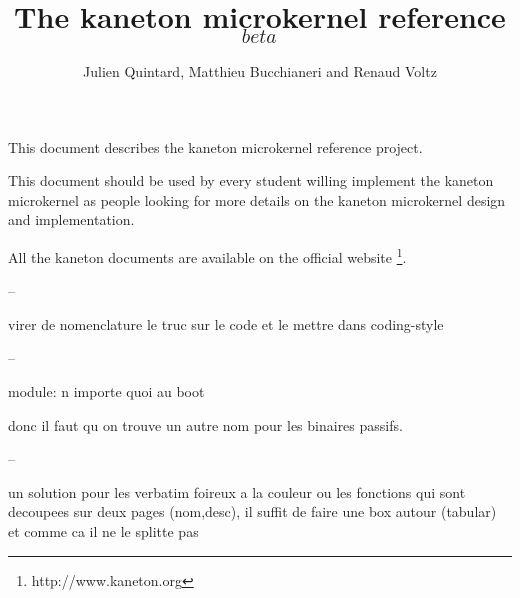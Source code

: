 %
%
%
%
%
%

%
%

\newcommand{\path}{../..}

%
%



%
%

\rhead{}

%
%

\title{The kaneton microkernel reference $_{beta}$
       \logos}

%
%

\author{\small{Julien Quintard},
        \small{Matthieu Bucchianeri} and
        \small{Renaud Voltz}}

%
%



%
%

\maketitle

%
%

This document describes the kaneton microkernel reference project.

This document should be used by every student willing implement the
kaneton microkernel as people looking for more details on the kaneton
microkernel design and implementation.

All the kaneton documents are available on
the official website
  \footnote{http://www.kaneton.org}.

%
%

\tableofcontents

%
%















%
%






--

virer de nomenclature le truc sur le code et le mettre dans coding-style

--

module: n importe quoi au boot

donc il faut qu on trouve un autre nom pour les binaires passifs.

--

un solution pour les verbatim foireux a la couleur ou les fonctions
qui sont decoupees sur deux pages (nom,desc), il suffit de faire une
box autour (tabular) et comme ca il ne le splitte pas

